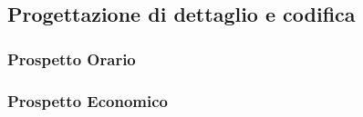 \subsection{Progettazione di dettaglio e codifica}

\subsubsection{Prospetto Orario}

\subsubsection{Prospetto Economico}

\pagebreak